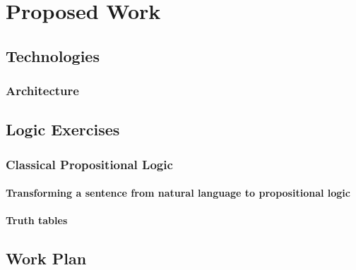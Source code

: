 
%

\chapter{Proposed Work}

\section{Technologies}
\subsection{Architecture}

\section{Logic Exercises}

\subsection{Classical Propositional Logic}
\subsubsection{Transforming a sentence from natural language to propositional logic}
\subsubsection{Truth tables}

\section{Work Plan}
